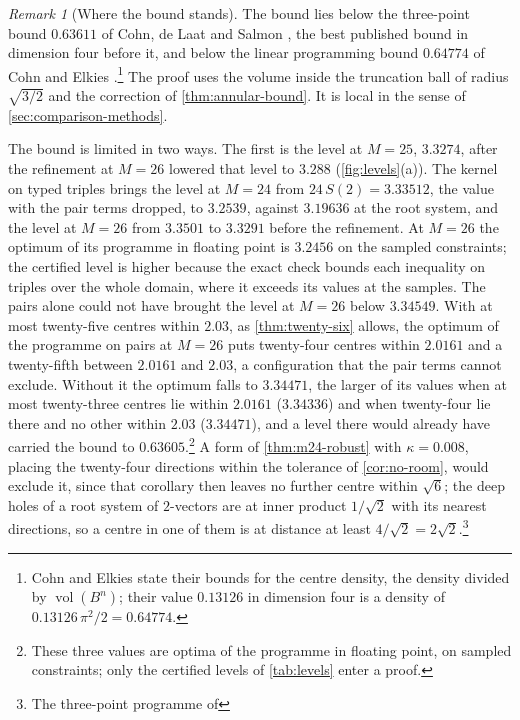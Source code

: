\documentclass[11pt,reqno]{amsart}
\renewcommand{\_}{\origunderscore\allowbreak}
\numberwithin{equation}{section}
\theoremstyle{plain}
\theoremstyle{definition}
\theoremstyle{remark}
\newtheorem{remark}[thm]{Remark}
\DeclareMathOperator{\vol}{vol}
\begin{document}


\begin{remark}[Where the bound stands]\label{rem:density-cells}
The bound lies below the three-point bound $0.63611$ of Cohn, de Laat and
Salmon \cite{CdLS22}, the best published bound in dimension four before
it, and below the linear programming bound $0.64774$ of Cohn and
Elkies \cite{CE03}.\footnote{Cohn and Elkies state their bounds for the centre
  density, the density divided by $\vol(B^n)$; their value $0.13126$ in
  dimension four is a density of $0.13126\,\pi^2/2=0.64774$.} The proof uses the volume inside the truncation ball of radius
$\sqrt{3/2}$ and the correction of \cref{thm:annular-bound}. It is
local in the sense of \cref{sec:comparison-methods}.

The bound is limited in two ways. The first is the level at $M=25$,
$3.3274$, after the refinement at $M=26$ lowered that level to $3.288$
(\cref{fig:levels}(a)). The kernel on typed triples brings the level at
$M=24$ from $24\,S(2)=3.33512$, the value with the pair terms dropped, to
$3.2539$, against $3.19636$ at the root system, and the level at $M=26$ from
$3.3501$ to $3.3291$ before the refinement.
At $M=26$ the optimum of its programme in floating
point is $3.2456$ on the sampled constraints; the certified level is higher
because the exact check bounds each inequality on triples over the whole
domain, where it exceeds its values at the samples. The pairs alone could
not have brought the level at $M=26$ below $3.34549$.
With at most twenty-five centres within $2.03$, as
\cref{thm:twenty-six} allows, the optimum of the programme on pairs at $M=26$ puts
twenty-four centres within $2.0161$ and a twenty-fifth between $2.0161$ and
$2.03$, a configuration that the pair terms cannot exclude. Without it the
optimum falls to $3.34471$, the larger of its values when at most
twenty-three centres lie within $2.0161$ ($3.34336$) and when twenty-four
lie there and no other within $2.03$ ($3.34471$), and a level there would
already have carried the bound to $0.63605$.\footnote{These
  three values are optima of the programme in floating point, on sampled
  constraints; only the certified levels of \cref{tab:levels} enter a
  proof.} A form of \cref{thm:m24-robust} with $\kappa=0.008$,
placing the twenty-four directions within the tolerance of
\cref{cor:no-room}, would exclude it, since that corollary then leaves no
further centre within $\sqrt6$; the deep holes of a root system of
$2$-vectors are at inner product $1/\sqrt2$ with its nearest directions, so
a centre in one of them is at distance at least $4/\sqrt2=2\sqrt2$.\footnote{The three-point programme of
}
\end{remark}
\end{document}
